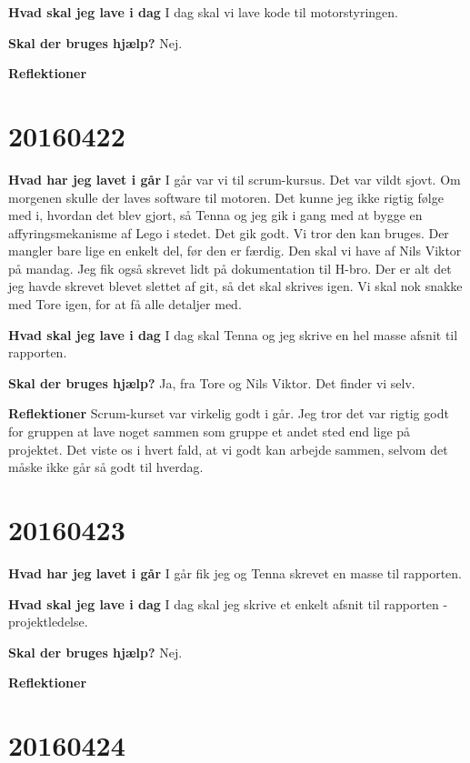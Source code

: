 \documentclass{article}
\begin{document}
	\textbf{Hvad skal jeg lave i dag}
	I dag skal vi lave kode til motorstyringen. 
	
	\textbf{Skal der bruges hjælp?}
	Nej.  
	
	\textbf{Reflektioner}
	
	\section{20160422}
	
	\textbf{Hvad har jeg lavet i går}
	I går var vi til scrum-kursus. Det var vildt sjovt. Om morgenen skulle der laves software til motoren. Det kunne jeg ikke rigtig følge med i, hvordan det blev gjort, så Tenna og jeg gik i gang med at bygge en affyringsmekanisme af Lego i stedet. Det gik godt. Vi tror den kan bruges. Der mangler bare lige en enkelt del, før den er færdig. Den skal vi have af Nils Viktor på mandag. Jeg fik også skrevet lidt på dokumentation til H-bro. Der er alt det jeg havde skrevet blevet slettet af git, så det skal skrives igen. Vi skal nok snakke med Tore igen, for at få alle detaljer med. 
	
	\textbf{Hvad skal jeg lave i dag}
	I dag skal Tenna og jeg skrive en hel masse afsnit til rapporten. 
	
	\textbf{Skal der bruges hjælp?}
	Ja, fra Tore og Nils Viktor. Det finder vi selv. 
	
	\textbf{Reflektioner}
	Scrum-kurset var virkelig godt i går. Jeg tror det var rigtig godt for gruppen at lave noget sammen som gruppe et andet sted end lige på projektet. Det viste os i hvert fald, at vi godt kan arbejde sammen, selvom det måske ikke går så godt til hverdag. 
	
	\section{20160423}
	
	\textbf{Hvad har jeg lavet i går}
	I går fik jeg og Tenna skrevet en masse til rapporten. 
	
	\textbf{Hvad skal jeg lave i dag}
	I dag skal jeg skrive et enkelt afsnit til rapporten - projektledelse. 
	
	\textbf{Skal der bruges hjælp?}
	Nej.  
	
	\textbf{Reflektioner}
	
	\section{20160424}
	
\end{document}
